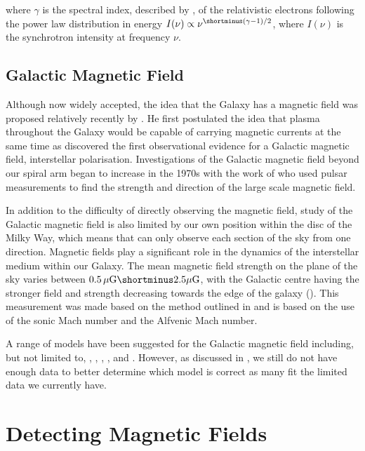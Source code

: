 \noindent where $\gamma$ is the spectral index, described by \cite{Ginzburg}, of the relativistic electrons following the power law distribution in energy $I(\nu) \propto \nu^{\shortminus(\gamma-1)/2}$, where $I(\nu)$ is the synchrotron intensity at frequency $\nu$.


\subsection{Galactic Magnetic Field}

Although now widely accepted, the idea that the Galaxy has a magnetic field was proposed relatively recently by \cite{Alfven}. He first postulated the idea that plasma throughout the Galaxy would be capable of carrying magnetic currents at the same time as \cite{Hiltner} discovered the first observational evidence for a Galactic magnetic field,  interstellar polarisation. Investigations of the Galactic magnetic field beyond our spiral arm began to increase in the 1970s with the work of \cite{Ruzmaikin_and_Sokolov_1977} who used pulsar measurements to find the strength and direction of the large scale magnetic field.

In addition to the difficulty of directly observing the magnetic field, study of the Galactic magnetic field is also limited by our own position within the disc of the Milky Way, which means that can only observe each section of the sky from one direction. Magnetic fields play a significant role in the dynamics of the interstellar medium within our Galaxy. The mean magnetic field strength on the plane of the sky varies between $0.5\, \mu{\rm G}\shortminus2.5\mu{\rm G}$, with the Galactic centre having the stronger field and strength decreasing towards the edge of the galaxy (\cite{Hu_2023}). This measurement was made based on the method outlined in \cite{lazarian2020obtainingmagneticfieldstrength} and is based on the use of the sonic Mach number and the Alfvenic Mach number.

A range of models have been suggested for the Galactic magnetic field including, but not limited to, \cite{Shukurov_2019}, \cite{Jansson_2012}, \cite{Sun_2010}, \cite{Fauvet_2011}, \cite{Van_Eck_2011} and \cite{Tinyakov_2002}. However, as discussed in \cite{Planck_2016}, we still do not have enough data to better determine which model is correct as many fit the limited data we currently have. 




\section{Detecting Magnetic Fields}

